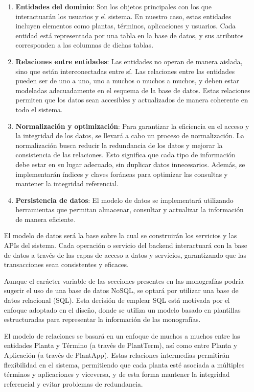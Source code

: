 \begin{enumerate} 
    \item \textbf{Entidades del dominio}: Son los objetos principales con los que interactuarán los usuarios y el sistema. 
    En nuestro caso, estas entidades incluyen elementos como plantas, términos, aplicaciones y usuarios. Cada entidad está representada 
    por una tabla en la base de datos, y sus atributos corresponden a las columnas de dichas tablas.
    \item \textbf{Relaciones entre entidades}: Las entidades no operan de manera aislada, sino que están interconectadas entre sí. Las relaciones 
    entre las entidades pueden ser de uno a uno, uno a muchos o muchos a muchos, y deben estar modeladas adecuadamente en el esquema de la 
    base de datos. Estas relaciones permiten que los datos sean accesibles y actualizados de manera coherente en todo el sistema.
    \item \textbf{Normalización y optimización}: Para garantizar la eficiencia en el acceso y la integridad de los datos, se llevará a cabo un 
    proceso de normalización. La normalización busca reducir la redundancia de los datos y mejorar la consistencia de las relaciones. Esto significa 
    que cada tipo de información debe estar en su lugar adecuado, sin duplicar datos innecesarios.
    Además, se implementarán índices y claves foráneas para optimizar las consultas y mantener la integridad referencial.
    \item \textbf{Persistencia de datos}: El modelo de datos se implementará utilizando herramientas que permitan almacenar, consultar y actualizar la información de manera eficiente.
\end{enumerate}

El modelo de datos será la base sobre la cual se construirán los servicios y las APIs del sistema. Cada operación o servicio del backend interactuará con la base de datos a través 
de las capas de acceso a datos y servicios, garantizando que las transacciones sean consistentes y eficaces.

Aunque el carácter variable de las secciones presentes en las monografías podría sugerir el uso de una base de datos NoSQL, se optará por utilizar una base de datos relacional (SQL).
Esta decisión de emplear SQL está motivada por el enfoque adoptado en el diseño, donde se utiliza un modelo basado en plantillas estructuradas para representar la información de las monografías.

El modelo de relaciones se basará en un enfoque de muchos a muchos entre las entidades Planta y Término (a través de PlantTerm), así como entre Planta y Aplicación (a través de PlantApp). 
Estas relaciones intermedias permitirán flexibilidad en el sistema, permitiendo que cada planta esté asociada a múltiples términos y aplicaciones y viceversa, y de esta forma mantener la integridad 
referencial y evitar problemas de redundancia. 

